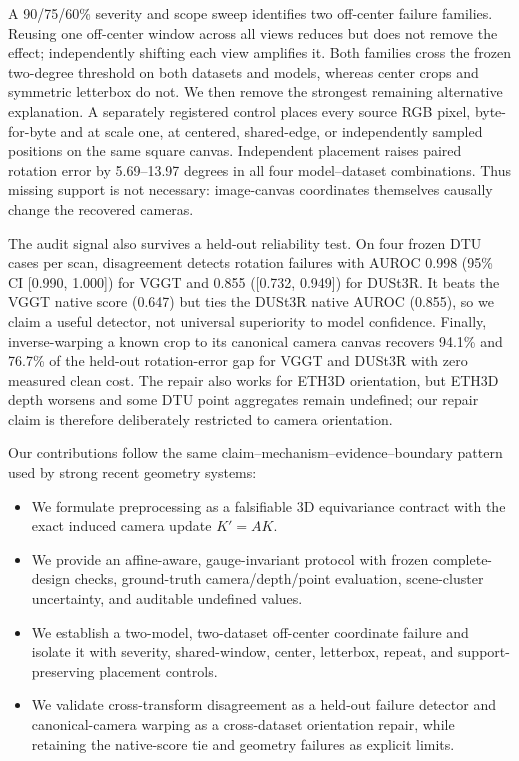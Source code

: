 A 90/75/60\% severity and scope sweep identifies two off-center failure
families.  Reusing one off-center window across all views reduces but does not
remove the effect; independently shifting each view amplifies it.  Both
families cross the frozen two-degree threshold on both datasets and models,
whereas center crops and symmetric letterbox do not.  We then remove the
strongest remaining alternative explanation.  A separately registered control
places every source RGB pixel, byte-for-byte and at scale one, at centered,
shared-edge, or independently sampled positions on the same square canvas.
Independent placement raises paired rotation error by 5.69--13.97 degrees in
all four model--dataset combinations.  Thus missing support is not necessary:
image-canvas coordinates themselves causally change the recovered cameras.

The audit signal also survives a held-out reliability test.  On four frozen
DTU cases per scan, disagreement detects rotation failures with AUROC 0.998
(95\% CI [0.990, 1.000]) for VGGT and 0.855 ([0.732, 0.949]) for DUSt3R.  It
beats the VGGT native score (0.647) but ties the DUSt3R native AUROC (0.855), so
we claim a useful detector, not universal superiority to model confidence.
Finally, inverse-warping a known crop to its canonical camera canvas recovers
94.1\% and 76.7\% of the held-out rotation-error gap for VGGT and DUSt3R with
zero measured clean cost.  The repair also works for ETH3D orientation, but
ETH3D depth worsens and some DTU point aggregates remain undefined; our repair
claim is therefore deliberately restricted to camera orientation.

Our contributions follow the same claim--mechanism--evidence--boundary pattern
used by strong recent geometry systems:
\begin{itemize}
  \item We formulate preprocessing as a falsifiable 3D equivariance contract
        with the exact induced camera update $K'=AK$.
  \item We provide an affine-aware, gauge-invariant protocol with frozen
        complete-design checks, ground-truth camera/depth/point evaluation,
        scene-cluster uncertainty, and auditable undefined values.
  \item We establish a two-model, two-dataset off-center coordinate failure and
        isolate it with severity, shared-window, center, letterbox, repeat, and
        support-preserving placement controls.
  \item We validate cross-transform disagreement as a held-out failure detector
        and canonical-camera warping as a cross-dataset orientation repair,
        while retaining the native-score tie and geometry failures as explicit
        limits.
\end{itemize}
